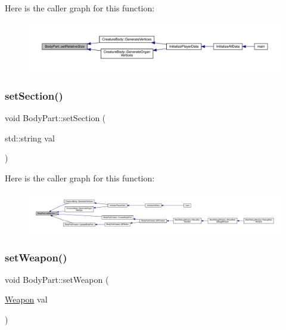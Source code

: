 Here is the caller graph for this function\+:
\nopagebreak
\begin{figure}[H]
\begin{center}
\leavevmode
\includegraphics[width=350pt]{d2/d6f/class_body_part_ab22b9412b4959e3a0a42efc79e409199_icgraph}
\end{center}
\end{figure}
\mbox{\label{class_body_part_acae2236af2e131dfb8a49b4ca62d0d1f}} 
\subsubsection{\texorpdfstring{set\+Section()}{setSection()}}
{\footnotesize\ttfamily void Body\+Part\+::set\+Section (\begin{DoxyParamCaption}\item[{std\+::string}]{val }\end{DoxyParamCaption})}

Here is the caller graph for this function\+:
\nopagebreak
\begin{figure}[H]
\begin{center}
\leavevmode
\includegraphics[width=350pt]{d2/d6f/class_body_part_acae2236af2e131dfb8a49b4ca62d0d1f_icgraph}
\end{center}
\end{figure}
\mbox{\label{class_body_part_a12897c5566d467977f7bbbe39665c4f5}} 
\subsubsection{\texorpdfstring{set\+Weapon()}{setWeapon()}}
{\footnotesize\ttfamily void Body\+Part\+::set\+Weapon (\begin{DoxyParamCaption}\item[{\mbox{\hyperlink{class_weapon}{Weapon}}}]{val }\end{DoxyParamCaption})}

